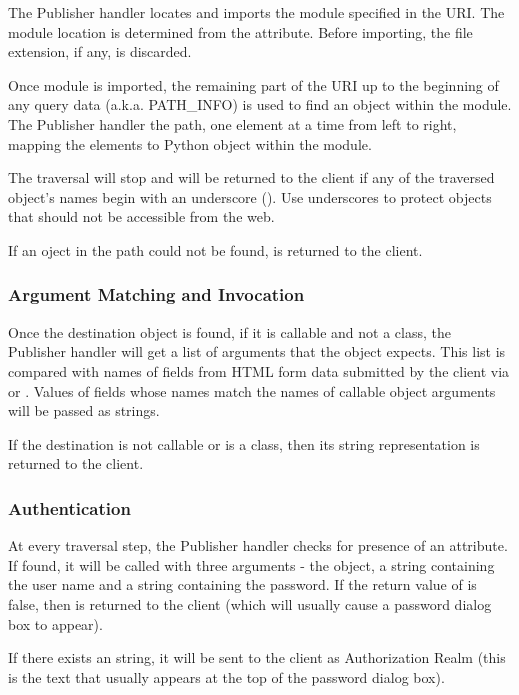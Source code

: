 The Publisher handler locates and imports the module specified in the
URI. The module location is determined from the
 attribute. Before importing, the file extension, 
if any, is discarded.

Once module is imported, the remaining part of the URI up to the
beginning of any query data (a.k.a. PATH_INFO) is used to find an
object within the module. The Publisher handler  the 
path, one element at a time from left to right, mapping the elements
to Python object within the module.

The traversal will stop and  will be returned to
the client if any of the traversed object's names begin with
an underscore (\samp{\_}). Use underscores to protect objects that should
not be accessible from the web. 

If an oject in the path could not be found, 
is returned to the client.

\subsubsection{Argument Matching and Invocation\label{hand-pub-alg-args}}

Once the destination object is found, if it is callable and not a
class, the Publisher handler will get a list of arguments that the
object expects. This list is compared with names of fields from HTML
form data submitted by the client via  or
. Values of fields whose names match the names of callable
object arguments will be passed as strings.

If the destination is not callable or is a class, then its string
representation is returned to the client.

\subsubsection{Authentication\label{hand-pub-alg-auth}}

At every traversal step, the Publisher handler checks for presence of
an  attribute. If found, it will be called with three
arguments - the  object, a string containing the user
name and a string containing the password. If the return value of
 is false, then  is
returned to the client (which will usually cause a password dialog box
to appear).

If there exists an  string, it will be sent
to the client as Authorization Realm (this is the text that usually
appears at the top of the password dialog box).

